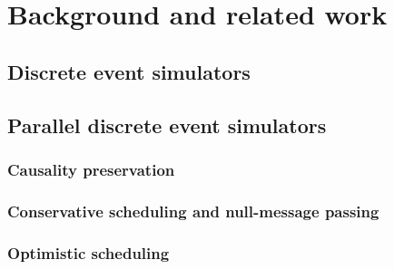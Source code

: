 \chapter{Background and related work}
\section{Discrete event simulators}

\section{Parallel discrete event simulators}
\subsection{Causality preservation}

\subsection{Conservative scheduling and null-message passing}

\subsection{Optimistic scheduling}
